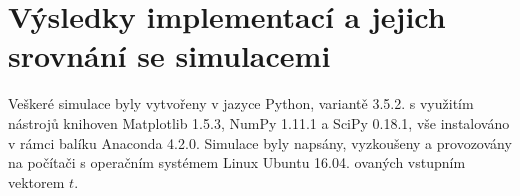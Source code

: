 \section{Výsledky implementací a jejich srovnání se simulacemi}

Veškeré simulace byly vytvořeny v jazyce Python, variantě 3.5.2. s využitím nástrojů knihoven Matplotlib 1.5.3, NumPy 1.11.1 a SciPy 0.18.1, vše instalováno v rámci balíku Anaconda 4.2.0. Simulace byly napsány, vyzkoušeny a provozovány na počítači s operačním systémem Linux Ubuntu 16.04.
ovaných vstupním vektorem $t$.


